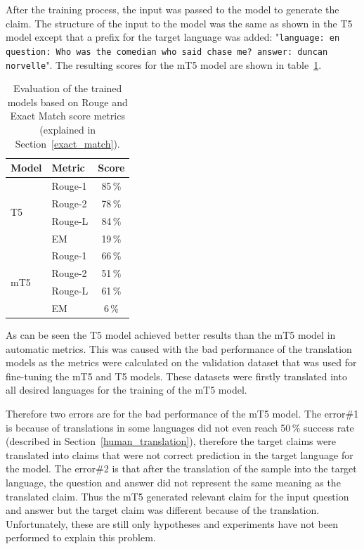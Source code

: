 After the training process, the input was passed to the model to generate the claim. The structure of the input to the model was the same as shown in the T5 model except that a prefix for the target language was added: "\texttt{language: en question: Who was the comedian who said chase me? answer: duncan norvelle}". The resulting scores for the mT5 model are shown in table~\ref{tab:t5_results}.

\begin{table}[h]
    \centering
    \begin{tabular}{l|lc}
        \hline
        Model & Metric & Score \\
        \hline
        \multirow{4}{*}{T5} & Rouge-1 & 85\,\% \\
         & Rouge-2 & 78\,\% \\
         & Rouge-L & 84\,\% \\
         & EM & 19\,\% \\
         \hline
        \multirow{4}{*}{mT5} & Rouge-1 & 66\,\% \\
         & Rouge-2 & 51\,\% \\
         & Rouge-L & 61\,\% \\
         & EM & 6\,\% \\
        \hline
    \end{tabular}
    \caption{Evaluation of the trained models based on Rouge and Exact Match score metrics (explained in Section~\ref{exact_match}).}
    \label{tab:t5_results}
\end{table}

As can be seen the T5 model achieved better results than the mT5 model in automatic metrics. This was caused with the bad performance of the translation models as the metrics were calculated on the validation dataset that was used for fine-tuning the mT5 and T5 models. These datasets were firstly translated into all desired languages for the training of the mT5 model.

Therefore two errors are for the bad performance of the mT5 model. The error\#1 is because of translations in some languages did not even reach 50\,\% success rate (described in Section~\ref{human_translation}), therefore the target claims were translated into claims that were not correct prediction in the target language for the model. The error\#2 is that after the translation of the sample into the target language, the question and answer did not represent the same meaning as the translated claim. Thus the mT5 generated relevant claim for the input question and answer but the target claim was different because of the translation. Unfortunately, these are still only hypotheses and experiments have not been performed to explain this problem.

